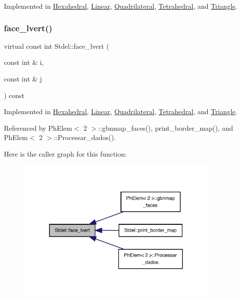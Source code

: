 Implemented in \hyperlink{classHexahedral_a57cb0909590d8f68c7ea9106e4218127}{Hexahedral}, \hyperlink{classLinear_a6b7d2f6ffb9cef8e9f6a6f2a8365db60}{Linear}, \hyperlink{classQuadrilateral_a329c8c6e8cc339122471f5142818d70e}{Quadrilateral}, \hyperlink{classTetrahedral_a2ffab801c153c3077ec7aec73d80b7bf}{Tetrahedral}, and \hyperlink{classTriangle_aac6e3645b886cfd2f4f406157b696d5a}{Triangle}.

\mbox{\label{classStdel_a0df3b2fe6d87c6d0067d07ac2a2d3a32}} 
\subsubsection{\texorpdfstring{face\+\_\+lvert()}{face\_lvert()}}
{\footnotesize\ttfamily virtual const int Stdel\+::face\+\_\+lvert (\begin{DoxyParamCaption}\item[{const int \&}]{i,  }\item[{const int \&}]{j }\end{DoxyParamCaption}) const\hspace{0.3cm}{\ttfamily [pure virtual]}}



Implemented in \hyperlink{classHexahedral_aacb21d16b3f2d28f29ae0b9b5cf3fbf2}{Hexahedral}, \hyperlink{classLinear_ab27641b2d84128bc1cfaf87f40d5af45}{Linear}, \hyperlink{classQuadrilateral_a1bf6b904ece09fa6e82c70b88118c33f}{Quadrilateral}, \hyperlink{classTetrahedral_a6d41f9bca28c634aad037ffaff071ed6}{Tetrahedral}, and \hyperlink{classTriangle_a54ef3345b002746852e4f2eb2f698ae2}{Triangle}.



Referenced by Ph\+Elem$<$ 2 $>$\+::gbnmap\+\_\+faces(), print\+\_\+border\+\_\+map(), and Ph\+Elem$<$ 2 $>$\+::\+Processar\+\_\+dados().

Here is the caller graph for this function\+:
\nopagebreak
\begin{figure}[H]
\begin{center}
\leavevmode
\includegraphics[width=284pt]{classStdel_a0df3b2fe6d87c6d0067d07ac2a2d3a32_icgraph}
\end{center}
\end{figure}
\mbox{\label{classStdel_a0775d0c4f7f15ae26bd45fc949e6f6b9}} 
